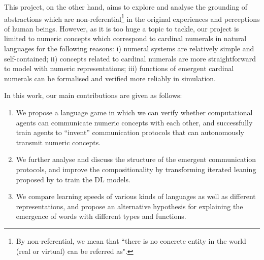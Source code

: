 This project, on the other hand, aims to explore and analyse the grounding of abstractions which are non-referential\footnote{By non-referential, we mean that ``there is no concrete entity in the world (real or virtual) can be referred as".} in the original experiences and perceptions of human beings. However, as it is too huge a topic to tackle, our project is limited to numeric concepts which correspond to cardinal numerals in natural languages for the following reasons: i) numeral systems are relatively simple and self-contained\cite{james1999numeral}; ii) concepts related to cardinal numerals are more straightforward to model with numeric representations; iii) functions of emergent cardinal numerals can be formalised and verified more reliably in simulation.

In this work, our main contributions are given as follows:

\begin{enumerate}
  \item We propose a language game in which we can verify whether computational agents can communicate numeric concepts with each other, and successfully train agents to ``invent'' communication protocols that can autonomously transmit numeric concepts.
  \item We further analyse and discuss the structure of the emergent communication protocols, and improve the compositionality by transforming iterated leaning proposed by \cite{smith2003iterated} to train the DL models.
  \item We compare learning speeds of various kinds of languages as well as different representations, and propose an alternative hypothesis for explaining the emergence of words with different types and functions.
\end{enumerate}
